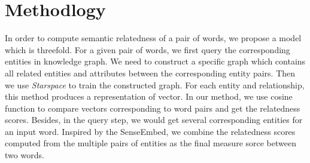 \section{Methodlogy}
\label{methodlogy}
In order to compute semantic relatedness of a pair of words, we propose a model which is
threefold. 
For a given pair of words, we first query the corresponding entities in knowledge graph.
We need to construct a specific graph which contains all related entities and attributes between the 
corresponding entity pairs. Then we use \emph{Starspace}\cite{corr/Ledell17} to train the constructed 
graph. For each entity and relationship, this method produces a representation of vector.
In our method, we use cosine function to compare vectors corresponding to word pairs and get the relatedness scores.
Besides, in the query step, we would get several corresponding entities for an input word. Inspired by
the SenseEmbed\cite{acl/IacobacciPN15}, we combine the relatedness scores computed from the multiple pairs of entities 
as the final measure sorce between two words.

\begin{table*}[]
    \small
    \centering
    \caption{Query Entities (\emph{DBPedia:} equals \emph{http://dbpedia.org/resource/})}
    \label{entities}
    \renewcommand\arraystretch{1.6}
\end{table*}

